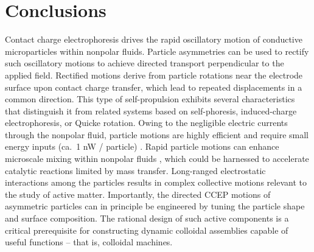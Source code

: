 \section{Conclusions}

Contact charge electrophoresis drives the rapid oscillatory motion of conductive microparticles within nonpolar fluids.
Particle asymmetries can be used to rectify such oscillatory motions to achieve directed transport perpendicular to the applied field.
Rectified motions derive from particle rotations near the electrode surface upon contact charge transfer, which lead to repeated displacements in a common direction.
This type of self-propulsion exhibits several characteristics that distinguish it from related systems based on self-phoresis, induced-charge electrophoresis, or Quicke rotation.
Owing to the negligible electric currents through the nonpolar fluid, particle motions are highly efficient and require small energy inputs (ca.~1 nW / particle) \cite{drews2015contact}. 
Rapid particle motions can enhance microscale mixing within nonpolar fluids \cite{cartier2014microfluidic}, which could be harnessed to accelerate catalytic reactions limited by mass transfer.
Long-ranged electrostatic interactions among the particles results in complex collective motions relevant to the study of active matter.
Importantly, the directed CCEP motions of asymmetric particles can in principle be engineered by tuning the particle shape and surface composition.
The rational design of such active components is a critical prerequisite for constructing dynamic colloidal assemblies capable of useful functions -- that is, colloidal machines.









